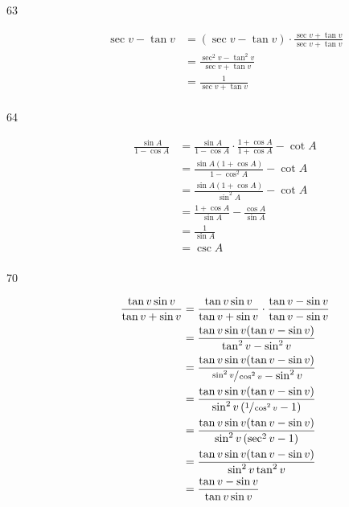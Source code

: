 \documentclass{exam}
\begin{document}
\begin{description}
      \item[63] 
        \begin{align*}
          \sec v - \tan v & = (\sec v - \tan v) \cdot \frac{\sec v + \tan v}{\sec v + \tan v} \\
                          & = \frac{\sec^2 v - \tan^2 v}{\sec v + \tan v} \\
                          & = \frac{1}{\sec v + \tan v} \\
        \end{align*}

      \item[64] 
        \begin{align*}
          \frac{\sin A}{1 - \cos A} & = \frac{\sin A}{1 - \cos A} \cdot \frac{1 + \cos A}{1 + \cos A} - \cot A \\
                                    & = \frac{\sin A ( 1 + \cos A )}{1 - \cos^2 A} - \cot A \\
                                    & = \frac{\sin A ( 1 + \cos A )}{\sin^2 A} - \cot A \\
                                    & = \frac{1 + \cos A}{\sin A} - \frac{\cos A}{\sin A} \\
                                    & = \frac{1}{\sin A} \\
                                    & = \csc A \\
        \end{align*}

      \item[70] 
        \begin{align*}
          \frac{\tan v \sin v}{\tan v + \sin v} & = \frac{\tan v \sin v}{\tan v + \sin v} \cdot \frac{\tan v - \sin v}{\tan v - \sin v} \\
                                                & = \frac{\tan v \sin v (\tan v - \sin v)}{\tan^2 v - \sin^2 v} \\
                                                & = \frac{\tan v \sin v (\tan v - \sin v)}{\sfrac{\sin^2 v}{\cos^2 v} - \sin^2 v} \\
                                                & = \frac{\tan v \sin v (\tan v - \sin v)}{\sin^2 v \left( \sfrac{1}{\cos^2 v} - 1 \right) } \\
                                                & = \frac{\tan v \sin v (\tan v - \sin v)}{\sin^2 v \left( \sec^2 v - 1 \right) } \\
                                                & = \frac{\tan v \sin v (\tan v - \sin v)}{\sin^2 v \tan^2 v } \\
                                                & = \frac{\tan v - \sin v}{\tan v \sin v } \\
        \end{align*}


\end{description}
\end{document}
